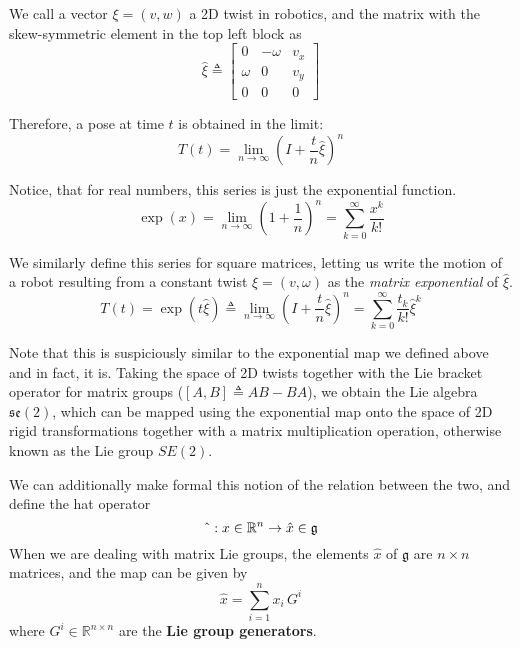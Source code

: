 \documentclass[reqno]{amsart}
\theoremstyle{definition}
\numberwithin{equation}{section}
\begin{document}
 We call a vector $\xi = (v, w)$ a 2D twist in robotics, and the matrix with the skew-symmetric element in the top left block as
 \begin{equation*}
    \hat\xi \triangleq \begin{bmatrix}
        0 & -\omega & v_x \\
        \omega & 0 & v_y \\
        0 & 0 & 0
    \end{bmatrix}
 \end{equation*}

 Therefore, a pose at time $t$ is obtained in the limit:
 \begin{equation*}
     T(t) = \lim_{n \to \infty}(I + \frac{t}{n}\hat\xi)^n  
 \end{equation*}

 Notice, that for real numbers, this series is just the exponential function.
 \begin{equation*}
     \exp(x) = \lim_{n \to \infty}(1 + \frac{1}{n})^n = \sum_{k = 0}^{\infty}\frac{x^k}{k!}
 \end{equation*}

 We similarly define this series for square matrices, letting us write the motion of a robot resulting from a constant twist $\xi = (v, \omega)$ as the \textit{matrix exponential} of $\hat\xi$.
 \begin{equation*}
     T(t) = \exp(t\hat\xi) \triangleq \lim_{n \to \infty}(I + \frac{t}{n}\hat\xi)^n = \sum_{k = 0}^{\infty} \frac{t_k}{k!}\hat\xi^k
 \end{equation*}

 Note that this is suspiciously similar to the exponential map we defined above and in fact, it is. Taking the space of 2D twists together with the Lie bracket operator for matrix groups ($[A, B] \triangleq AB - BA$), we obtain the Lie algebra $\mathfrak{se}(2)$, which can be mapped using the exponential map onto the space of 2D rigid transformations together with a matrix multiplication operation, otherwise known as the Lie group $SE(2)$.

 We can additionally make formal this notion of the relation between the two, and define the hat operator
 \begin{equation*}
     \string^ : x \in \mathbb{R}^n \to \hat x \in \mathfrak{g}
 \end{equation*}
 When we are dealing with matrix Lie groups, the elements $\hat x$ of $\mathfrak{g}$ are $n \times n$ matrices, and the map can be given by
 \begin{equation}\label{Matrix_Lie_Groups}
    \hat x = \sum_{i = 1}^n x_i\,G^i
 \end{equation}
 where $G^i \in \mathbb{R}^{n \times n}$ are the \textbf{Lie group generators}.
\end{document}

